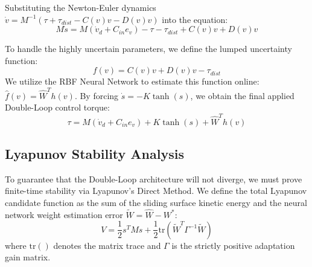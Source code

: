 \documentclass[conference]{IEEEtran}
\begin{document}
Substituting the Newton-Euler dynamics $\dot{v} = M^{-1}(\tau + \tau_{dist} - C(v)v - D(v)v)$ into the equation:
\begin{equation}
M\dot{s} = M(\dot{v}_d + C_{in} e_v) - \tau - \tau_{dist} + C(v)v + D(v)v
\end{equation}

To handle the highly uncertain parameters, we define the lumped uncertainty function:
\begin{equation}
f(v) = C(v)v + D(v)v - \tau_{dist}
\end{equation}
We utilize the RBF Neural Network to estimate this function online: $\hat{f}(v) = \hat{W}^T h(v)$. By forcing $\dot{s} = -K \tanh(s)$, we obtain the final applied Double-Loop control torque:
\begin{equation}
\tau = M(\dot{v}_d + C_{in} e_v) + K \tanh(s) + \hat{W}^T h(v)
\end{equation}

\subsection{Lyapunov Stability Analysis}
To guarantee that the Double-Loop architecture will not diverge, we must prove finite-time stability via Lyapunov's Direct Method. We define the total Lyapunov candidate function as the sum of the sliding surface kinetic energy and the neural network weight estimation error $\tilde{W} = \hat{W} - W^*$:
\begin{equation}
V = \frac{1}{2} s^T M s + \frac{1}{2} \text{tr}(\tilde{W}^T \Gamma^{-1} \tilde{W})
\end{equation}
where $\text{tr}()$ denotes the matrix trace and $\Gamma$ is the strictly positive adaptation gain matrix. 
\end{document}
